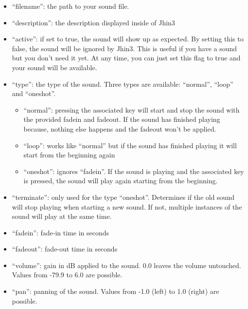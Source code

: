 \begin{itemize}
\item ``filename'': the path to your sound file.
\item ``description'': the description displayed inside of Jhin3
\item ``active'': if set to true, the sound will show up as expected. By setting this to false, the sound will be ignored by Jhin3. This is useful if you have a sound but you don't need it yet. At any time, you can just set this flag to true and your sound will be available.
\item ``type'': the type of the sound. Three types are available: ``normal'', ``loop'' and ``oneshot''.
	\begin{itemize}
	\item ``normal'': pressing the associated key will start and stop the sound with the provided fadein and fadeout. If the sound has finished playing because, nothing else happens and the fadeout won't be applied.
	\item ``loop'': works like ``normal'' but if the sound has finished playing it will start from the beginning again
	\item ``oneshot'': ignores ``fadein''. If the sound is playing and the associated key is pressed, the sound will play again starting from the beginning.
	\end{itemize}
\item ``terminate'': only used for the type ``oneshot''. Determines if the old sound will stop playing when starting a new sound. If not, multiple instances of the sound will play at the same time.
\item ``fadein'': fade-in time in seconds
\item ``fadeout'': fade-out time in seconds
\item ``volume'': gain in dB applied to the sound. 0.0 leaves the volume untouched. Values from -79.9 to 6.0 are possible.
\item ``pan'': panning of the sound. Values from -1.0 (left) to 1.0 (right) are possible.
\end{itemize}

\newpage
